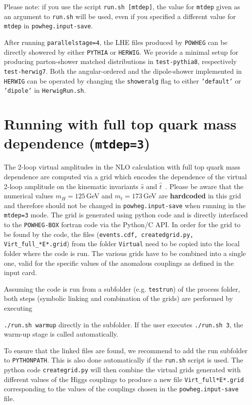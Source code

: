 \documentclass[paper]{JHEP3}
\newcommand\POWHEG{{\tt POWHEG}}
\newcommand\POWHEGBOX{{\tt POWHEG-BOX}}
\newcommand\HERWIG{{\tt HERWIG}}
\newcommand\PYTHIA{{\tt PYTHIA}}
\renewenvironment{description}[1][0pt]
  {\list{}{\labelwidth=0pt \leftmargin=#1
   \let\makelabel\descriptionlabel}}
  {\endlist}
\begin{document}
\noindent Please note: if you use the script {\tt run.sh [mtdep]}, the value for {\tt mtdep} given as an argument to {\tt run.sh} will be used, even if you specified a different value for {\tt mtdep} in {\tt powheg.input-save}.

After running {\tt parallelstage=4}, the LHE files produced by \POWHEG{} can be directly showered by either \PYTHIA{} or \HERWIG{}. We provide a minimal setup for producing parton-shower matched distributions in {\tt test-pythia8}, respectively {\tt test-herwig7}. Both the angular-ordered and the dipole-shower implemented in \HERWIG{} can be operated by changing the {\tt showeralg} flag to either {\tt 'default'} or {\tt 'dipole'} in {\tt HerwigRun.sh}.

\section{Running with full top quark mass dependence ({\tt mtdep=3})}
The 2-loop virtual amplitudes in the NLO calculation with full top quark mass dependence are computed via a grid
which encodes the dependence of the virtual 2-loop amplitude on the
kinematic invariants $\hat{s}$ and
$\hat{t}$~\cite{Heinrich:2017kxx}. Please be aware that the numerical
values $m_H=125$\,GeV and $m_t=173$\,GeV are {\bf hardcoded} in this
grid and therefore should not be changed in {\tt powheg.input-save} when running in the {\tt mtdep=3} mode.
The grid is generated using python code and is directly interfaced to the
\POWHEGBOX{} fortran code via the Python/C API. In order for the grid to be found by the code, the
files ({\tt events.cdf, createdgrid.py, Virt\_full\_*E*.grid}) from the
folder {\tt Virtual} need to be copied into the local folder where the
code is run. The various grids have to be combined into a single one, valid
for the specific values of the anomalous couplings as defined in the input card.

Assuming the code is run from a
subfolder (e.g. {\tt testrun}) of the process folder, both steps (symbolic linking and combination
of the grids) are performed by executing

\begin{description}[.3in]
\item{\tt ./run.sh warmup}
\end{description}
%
directly in the subfolder. If the user executes {\tt ./run.sh 3}, the warm-up stage
is called automatically.

To ensure that the linked files are found, we recommend to add the run subfolder to {\tt PYTHONPATH}. This is also done automatically if the {\tt run.sh} script is used.
The python code {\tt creategrid.py} will then combine the virtual grids generated with different values of the Higgs couplings
to produce a new file {\tt Virt\_full*E*.grid} corresponding to the values of the couplings chosen in the {\tt powheg.input-save} file.
\end{document}
